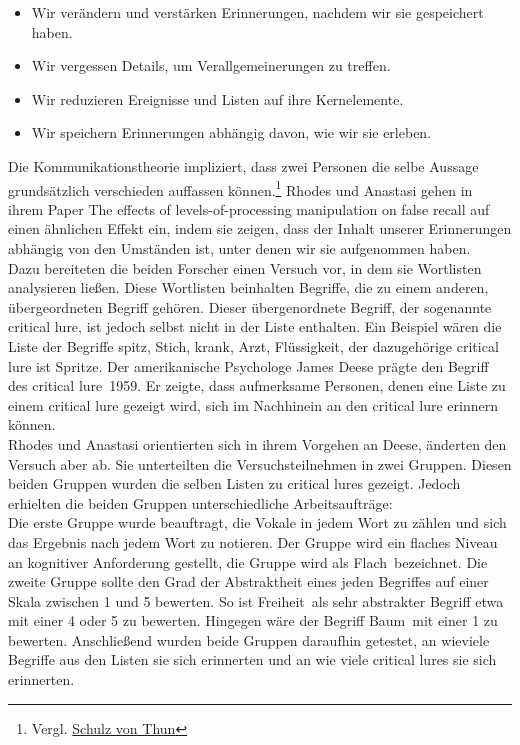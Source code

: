 \begin{itemize}
	\item Wir verändern und verstärken Erinnerungen, nachdem wir sie gespeichert haben. \cite{BRO91}
	\item Wir vergessen Details, um Verallgemeinerungen zu treffen. \cite{BAU01}
	\item Wir reduzieren Ereignisse und Listen auf ihre Kernelemente. \cite{KAH93}
	\item Wir speichern Erinnerungen abhängig davon, wie wir sie erleben.\cite{RHO00}
\end{itemize}

Die Kommunikationstheorie impliziert, dass zwei Personen die selbe Aussage grundsätzlich verschieden auffassen können.\footnote{Vergl. \href{https://www.schulz-von-thun.de/die-modelle/das-kommunikationsquadrat}{Schulz von Thun}} Rhodes und Anastasi gehen in ihrem Paper \glqq The effects of levels-of-processing manipulation on false recall\grqq\cite{RHO00} auf einen ähnlichen Effekt ein, indem sie zeigen, dass der Inhalt unserer Erinnerungen abhängig von den Umständen ist, unter denen wir sie aufgenommen haben. \\

Dazu bereiteten die beiden Forscher einen Versuch vor, in dem sie Wortlisten analysieren ließen. Diese Wortlisten beinhalten Begriffe, die zu einem anderen, übergeordneten Begriff gehören. Dieser übergenordnete Begriff, der sogenannte \glqq critical lure\grqq, ist jedoch selbst nicht in der Liste enthalten. Ein Beispiel wären die Liste der Begriffe \glqq spitz, Stich, krank, Arzt, Flüssigkeit\grqq, der dazugehörige critical lure ist \glqq Spritze\grqq. Der amerikanische Psychologe James Deese prägte den Begriff des \glqq critical lure\grqq~1959.\cite{DEE59} Er zeigte, dass aufmerksame Personen, denen eine Liste zu einem critical lure gezeigt wird, sich im Nachhinein an den critical lure erinnern können. \\

Rhodes und Anastasi orientierten sich in ihrem Vorgehen an Deese\cite{DEE59}, änderten den Versuch aber ab. Sie unterteilten die Versuchsteilnehmen in zwei Gruppen. Diesen beiden Gruppen wurden die selben Listen zu critical lures gezeigt. Jedoch erhielten die beiden Gruppen unterschiedliche Arbeitsaufträge: \\

Die erste Gruppe wurde beauftragt, die Vokale in jedem Wort zu zählen und sich das Ergebnis nach jedem Wort zu notieren. Der Gruppe wird ein flaches Niveau an kognitiver Anforderung gestellt, die Gruppe wird als \glqq Flach\grqq~bezeichnet. \cite[S.160]{RHO00} Die zweite Gruppe sollte den Grad der Abstraktheit eines jeden Begriffes auf einer Skala zwischen 1 und 5 bewerten. So ist \glqq Freiheit\grqq~als sehr abstrakter Begriff etwa mit einer 4 oder 5 zu bewerten. Hingegen wäre der Begriff \glqq Baum\grqq~mit einer 1 zu bewerten. Anschließend wurden beide Gruppen daraufhin getestet, an wieviele Begriffe aus den Listen sie sich erinnerten und an wie viele critical lures sie sich erinnerten.\\

